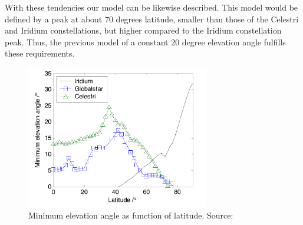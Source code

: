With these tendencies our model can be likewise described. This model would be defined by a peak at about 70 degrees latitude, smaller than those of the Celestri and Iridium constellations, but higher compared to the Iridium constellation peak. Thus, the previous model of a constant 20 degree elevation angle fulfills these requirements. 


\begin{figure}[h]
\includegraphics[width=8cm]{latitudes}
\centering
\caption{Minimum elevation angle as function of latitude. Source: \cite{Li2016}}
\end{figure}
